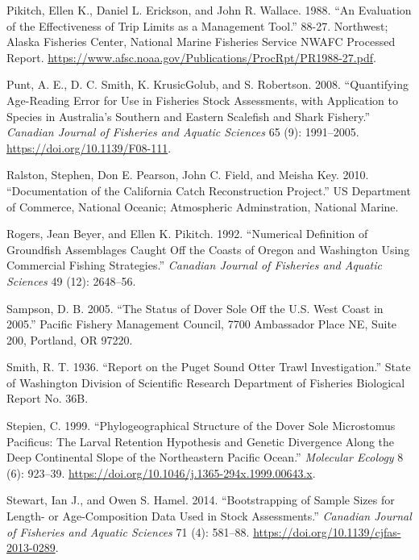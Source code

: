 \documentclass[11pt,
  english,
  a4paper,
]{article}
\begin{document}
\begin{cslreferences}
\leavevmode\hypertarget{ref-pikitch_evaluation_1988}{}%
Pikitch, Ellen K., Daniel L. Erickson, and John R. Wallace. 1988. ``An Evaluation of the Effectiveness of Trip Limits as a Management Tool.'' 88-27. Northwest; Alaska Fisheries Center, National Marine Fisheries Service NWAFC Processed Report. \url{https://www.afsc.noaa.gov/Publications/ProcRpt/PR1988-27.pdf}.

\leavevmode\hypertarget{ref-punt_quantifying_2008}{}%
Punt, A. E., D. C. Smith, K. KrusicGolub, and S. Robertson. 2008. ``Quantifying Age-Reading Error for Use in Fisheries Stock Assessments, with Application to Species in Australia's Southern and Eastern Scalefish and Shark Fishery.'' \emph{Canadian Journal of Fisheries and Aquatic Sciences} 65 (9): 1991--2005. \url{https://doi.org/10.1139/F08-111}.

\leavevmode\hypertarget{ref-ralston_documentation_2010}{}%
Ralston, Stephen, Don E. Pearson, John C. Field, and Meisha Key. 2010. ``Documentation of the California Catch Reconstruction Project.'' US Department of Commerce, National Oceanic; Atmospheric Adminstration, National Marine.

\leavevmode\hypertarget{ref-rogers_numerical_1992}{}%
Rogers, Jean Beyer, and Ellen K. Pikitch. 1992. ``Numerical Definition of Groundfish Assemblages Caught Off the Coasts of Oregon and Washington Using Commercial Fishing Strategies.'' \emph{Canadian Journal of Fisheries and Aquatic Sciences} 49 (12): 2648--56.

\leavevmode\hypertarget{ref-sampson_status_2005}{}%
Sampson, D. B. 2005. ``The Status of Dover Sole Off the U.S. West Coast in 2005.'' Pacific Fishery Management Council, 7700 Ambassador Place NE, Suite 200, Portland, OR 97220.

\leavevmode\hypertarget{ref-smith_report_1936}{}%
Smith, R. T. 1936. ``Report on the Puget Sound Otter Trawl Investigation.'' State of Washington Division of Scientific Research Department of Fisheries Biological Report No. 36B.

\leavevmode\hypertarget{ref-stepien_phylogeographical_1999}{}%
Stepien, C. 1999. ``Phylogeographical Structure of the Dover Sole Microstomus Pacificus: The Larval Retention Hypothesis and Genetic Divergence Along the Deep Continental Slope of the Northeastern Pacific Ocean.'' \emph{Molecular Ecology} 8 (6): 923--39. \url{https://doi.org/10.1046/j.1365-294x.1999.00643.x}.

\leavevmode\hypertarget{ref-stewart_bootstrapping_2014}{}%
Stewart, Ian J., and Owen S. Hamel. 2014. ``Bootstrapping of Sample Sizes for Length- or Age-Composition Data Used in Stock Assessments.'' \emph{Canadian Journal of Fisheries and Aquatic Sciences} 71 (4): 581--88. \url{https://doi.org/10.1139/cjfas-2013-0289}.


\end{cslreferences}
\end{document}
